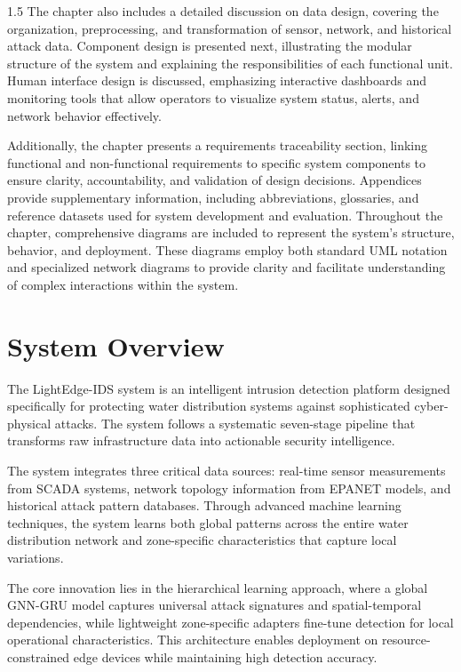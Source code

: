 \begin{spacing}{1.5}
The chapter also includes a detailed discussion on data design, covering the organization, preprocessing, and transformation of sensor, network, and historical attack data. Component design is presented next, illustrating the modular structure of the system and explaining the responsibilities of each functional unit. Human interface design is discussed, emphasizing interactive dashboards and monitoring tools that allow operators to visualize system status, alerts, and network behavior effectively.  

Additionally, the chapter presents a requirements traceability section, linking functional and non-functional requirements to specific system components to ensure clarity, accountability, and validation of design decisions. Appendices provide supplementary information, including abbreviations, glossaries, and reference datasets used for system development and evaluation. Throughout the chapter, comprehensive diagrams are included to represent the system’s structure, behavior, and deployment. These diagrams employ both standard UML notation and specialized network diagrams to provide clarity and facilitate understanding of complex interactions within the system.  






\newpage
\section{System Overview}

The LightEdge-IDS system is an intelligent intrusion detection platform designed specifically for protecting water distribution systems against sophisticated cyber-physical attacks. The system follows a systematic seven-stage pipeline that transforms raw infrastructure data into actionable security intelligence.

The system integrates three critical data sources: real-time sensor measurements from SCADA systems, network topology information from EPANET models, and historical attack pattern databases. Through advanced machine learning techniques, the system learns both global patterns across the entire water distribution network and zone-specific characteristics that capture local variations.

The core innovation lies in the hierarchical learning approach, where a global GNN-GRU model captures universal attack signatures and spatial-temporal dependencies, while lightweight zone-specific adapters fine-tune detection for local operational characteristics. This architecture enables deployment on resource-constrained edge devices while maintaining high detection accuracy.


\end{spacing}
